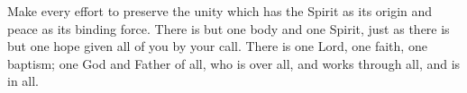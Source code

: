 \lettrine[lines=3]{M}{}ake every effort to preserve the unity which has the Spirit as its origin and peace as its binding force. There is but one body and one Spirit, just as there is but one hope given all of you by your call. There is one Lord, one faith, one baptism; one God and Father of all, who is over all, and works through all, and is in all.